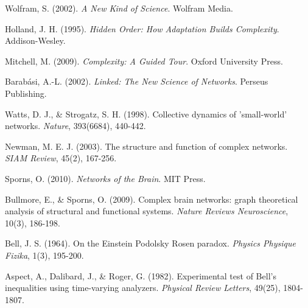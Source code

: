\documentclass{article}
\begin{document}
\begin{thebibliography}{99}
Wolfram, S. (2002). \textit{A New Kind of Science}. Wolfram Media.

Holland, J. H. (1995). \textit{Hidden Order: How Adaptation Builds Complexity}. Addison-Wesley.

Mitchell, M. (2009). \textit{Complexity: A Guided Tour}. Oxford University Press.

Barabási, A.-L. (2002). \textit{Linked: The New Science of Networks}. Perseus Publishing.

Watts, D. J., \& Strogatz, S. H. (1998). Collective dynamics of 'small-world' networks. \textit{Nature}, 393(6684), 440-442.

Newman, M. E. J. (2003). The structure and function of complex networks. \textit{SIAM Review}, 45(2), 167-256.

Sporns, O. (2010). \textit{Networks of the Brain}. MIT Press.

Bullmore, E., \& Sporns, O. (2009). Complex brain networks: graph theoretical analysis of structural and functional systems. \textit{Nature Reviews Neuroscience}, 10(3), 186-198.

Bell, J. S. (1964). On the Einstein Podolsky Rosen paradox. \textit{Physics Physique Fizika}, 1(3), 195-200.

Aspect, A., Dalibard, J., \& Roger, G. (1982). Experimental test of Bell's inequalities using time-varying analyzers. \textit{Physical Review Letters}, 49(25), 1804-1807.

\end{thebibliography}
\end{document}
